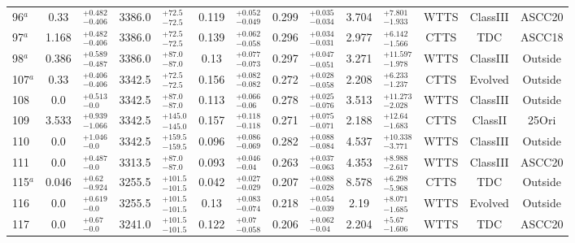 \documentclass[12pt]{article}
\begin{document}
\begin{table}
\begin{threeparttable}
\begin{tabular}{lclclclclclccc}
 	96$^a  $    & 0.33  & $^{+0.482}_{-0.406}$ & 3386.0 & $^{+72.5  }_{-72.5 }$ & 0.119 & $^{+0.052 }_{-0.049}$ & 0.299 & $^{+0.035 }_{-0.034}$ & 3.704  & $^{+7.801  }_{-1.933}$  & WTTS & ClassIII & ASCC20        \\
 	97$^a  $    & 1.168 & $^{+0.482}_{-0.406}$ & 3386.0 & $^{+72.5  }_{-72.5 }$ & 0.139 & $^{+0.062 }_{-0.058}$ & 0.296 & $^{+0.034 }_{-0.031}$ & 2.977  & $^{+6.142  }_{-1.566}$  & CTTS & TDC      & ASCC18        \\
 	98$^a  $    & 0.386 & $^{+0.589}_{-0.487}$ & 3386.0 & $^{+87.0  }_{-87.0 }$ & 0.13  & $^{+0.077 }_{-0.073}$ & 0.297 & $^{+0.047 }_{-0.051}$ & 3.271  & $^{+11.597 }_{-1.978}$  & WTTS & ClassIII & Outside       \\
 	107$^a $    & 0.33  & $^{+0.406}_{-0.406}$ & 3342.5 & $^{+72.5  }_{-72.5 }$ & 0.156 & $^{+0.082 }_{-0.082}$ & 0.272 & $^{+0.028 }_{-0.058}$ & 2.208  & $^{+6.233  }_{-1.237}$  & CTTS & Evolved  & Outside       \\
 	108         & 0.0   & $^{+0.513}_{-0.0  }$ & 3342.5 & $^{+87.0  }_{-87.0 }$ & 0.113 & $^{+0.066 }_{-0.06 }$ & 0.278 & $^{+0.025 }_{-0.076}$ & 3.513  & $^{+11.273 }_{-2.028}$  & WTTS & ClassIII & Outside       \\
 	109         & 3.533 & $^{+0.939}_{-1.066}$ & 3342.5 & $^{+145.0 }_{-145.0}$ & 0.157 & $^{+0.118 }_{-0.118}$ & 0.271 & $^{+0.075 }_{-0.071}$ & 2.188  & $^{+12.64  }_{-1.683}$  & CTTS & ClassII  & 25Ori         \\
 	110         & 0.0   & $^{+1.046}_{-0.0  }$ & 3342.5 & $^{+159.5 }_{-159.5}$ & 0.096 & $^{+0.086 }_{-0.069}$ & 0.282 & $^{+0.088 }_{-0.084}$ & 4.537  & $^{+10.338 }_{-3.771}$  & WTTS & ClassIII & Outside       \\
 	111         & 0.0   & $^{+0.487}_{-0.0  }$ & 3313.5 & $^{+87.0  }_{-87.0 }$ & 0.093 & $^{+0.046 }_{-0.04 }$ & 0.263 & $^{+0.037 }_{-0.063}$ & 4.353  & $^{+8.988  }_{-2.617}$  & WTTS & ClassIII & ASCC20        \\
 	115$^a $    & 0.046 & $^{+0.62 }_{-0.924}$ & 3255.5 & $^{+101.5 }_{-101.5}$ & 0.042 & $^{+0.027 }_{-0.029}$ & 0.207 & $^{+0.088 }_{-0.028}$ & 8.578  & $^{+6.298  }_{-5.968}$  & CTTS & TDC      & Outside       \\
 	116         & 0.0   & $^{+0.619}_{-0.0  }$ & 3255.5 & $^{+101.5 }_{-101.5}$ & 0.13  & $^{+0.083 }_{-0.074}$ & 0.218 & $^{+0.054 }_{-0.039}$ & 2.19   & $^{+8.071  }_{-1.685}$  & WTTS & Evolved  & Outside       \\
 	117         & 0.0   & $^{+0.67 }_{-0.0  }$ & 3241.0 & $^{+101.5 }_{-101.5}$ & 0.122 & $^{+0.07  }_{-0.058}$ & 0.206 & $^{+0.062 }_{-0.04 }$ & 2.204  & $^{+5.67   }_{-1.606}$  & WTTS & TDC      & ASCC20        \\

\end{tabular}
\end{threeparttable}
\end{table}
\end{document}
